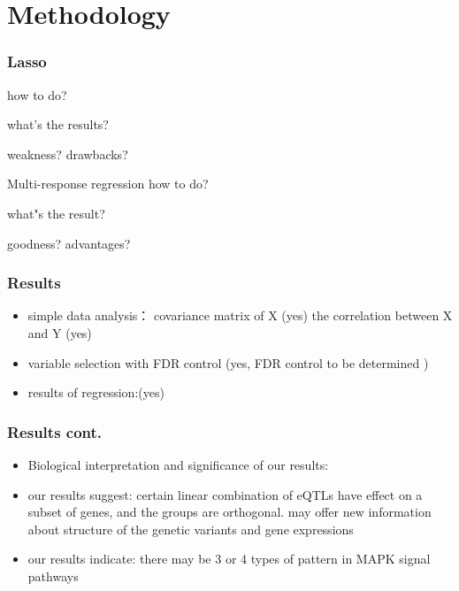 \section{Methodology}
\begin{frame}
    \sectionpage
\end{frame}

\begin{frame}
    \frametitle{Lasso}

    how to do?

    what's the results?

    weakness? drawbacks?
\end{frame}

\begin{frame}{Multi-response regression}
    how to do? 

    what"s the result?

    goodness? advantages?
    
\end{frame}

\begin{frame} \frametitle{Results}

    \begin{itemize}
        \item simple data analysis：
        covariance matrix of X (yes)
        the correlation between X and Y (yes)

        \item variable selection with FDR control (yes, FDR control to be determined )
        
        \item results of regression:(yes)
    \end{itemize}
\end{frame}

\begin{frame}
    \frametitle{Results cont.}

    \begin{itemize}
        \item Biological interpretation and significance of our results:
        \item our results suggest:
        certain linear combination of eQTLs have effect on a subset of genes, and the groups are orthogonal. 
        may offer new information about structure of the genetic variants and gene expressions

        \item our results indicate:
        there may be 3 or 4 types of pattern in MAPK signal pathways
    \end{itemize}

\end{frame}
